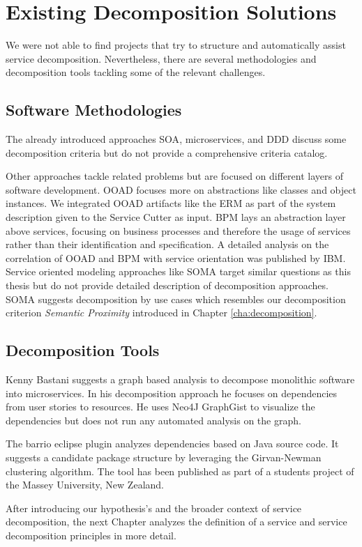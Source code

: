 \section{Existing Decomposition Solutions}

We were not able to find projects that try to structure and automatically assist service decomposition. Nevertheless, there are several methodologies and decomposition tools tackling some of the relevant challenges. 

\subsection{Software Methodologies}

The already introduced approaches \gls{SOA}, microservices, and \gls{DDD} discuss some decomposition criteria but do not provide a comprehensive criteria catalog. 

Other approaches tackle related problems but are focused on different layers of software development. \gls{OOAD} focuses more on abstractions like classes and object instances. We integrated \gls{OOAD} artifacts like the \gls{ERM} as part of the system description given to the Service Cutter as input. \gls{BPM} lays an abstraction layer above services, focusing on business processes and therefore the usage of services rather than their identification and specification. A detailed analysis on the correlation of \gls{OOAD} and \gls{BPM} with service orientation was published by IBM\cite{zimmermann2004elements}. Service oriented modeling approaches like \gls{SOMA}\cite{arsanjani2004service} target similar questions as this thesis but do not provide detailed description of decomposition approaches. \gls{SOMA} suggests decomposition by use cases which resembles our decomposition criterion \textit{Semantic Proximity} introduced in Chapter \ref{cha:decomposition}.

\subsection{Decomposition Tools}

Kenny Bastani suggests a graph based analysis to decompose monolithic software into microservices\cite{bastani}. In his decomposition approach he focuses on dependencies from user stories to resources. He uses Neo4J GraphGist\cite{graphGist} to visualize the dependencies but does not run any automated analysis on the graph. 

The barrio eclipse plugin\cite{dietrich2008cluster} analyzes dependencies based on Java source code. It suggests a candidate package structure by leveraging the Girvan-Newman clustering algorithm. The tool has been published as part of a students project of the Massey University, New Zealand.

\bigskip

After introducing our hypothesis's and the broader context of service decomposition, the next Chapter analyzes the definition of a service and service decomposition principles in more detail. 


